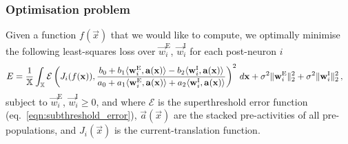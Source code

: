 \subsubsection{Optimisation problem}
Given a function $f(\vec x)$ that we would like to compute, we optimally minimise the following least-squares loss over $\vec w^\mathrm{E}_i$, $\vec w^\mathrm{I}_i$ for each post-neuron $i$
\begin{align}
	E &= \frac{1}{\mathbb{X}} \int_{\mathbb{X}} \mathcal{E} \left( J_i(f(\mathbf{x})), \frac{
		b_0 + b_1 \langle \mathbf{w}^\mathrm{E}_i, \mathbf{a}(\mathbf{x}) \rangle - b_2 \langle \mathbf{w}^\mathrm{I}_i, \mathbf{a}(\mathbf{x}) \rangle
	}{
		a_0 + a_1 \langle \mathbf{w}^\mathrm{E}_i, \mathbf{a}(\mathbf{x}) \rangle + a_2 \langle \mathbf{w}^\mathrm{I}_i, \mathbf{a}(\mathbf{x}) \rangle
 	}	
	\right)^2 \, d\mathbf{x} + \sigma^2 \| \mathbf{w}^\mathrm{E}_i \|^2_2 + \sigma^2 \| \mathbf{w}^\mathrm{I}_i \|^2_2 \,,
	\label{eqn:two_comp_optimal_weights}
\end{align}
subject to $\vec w^\mathrm{E}_i$, $\vec w^\mathrm{I}_i \geq 0$,
and where $\mathcal{E}$ is the superthreshold error function (eq.~\ref{eqn:subthreshold_error}), $\vec a(\vec x)$ are the stacked pre-activities of all pre-populations, and $J_i(\vec x)$ is the current-translation function.


